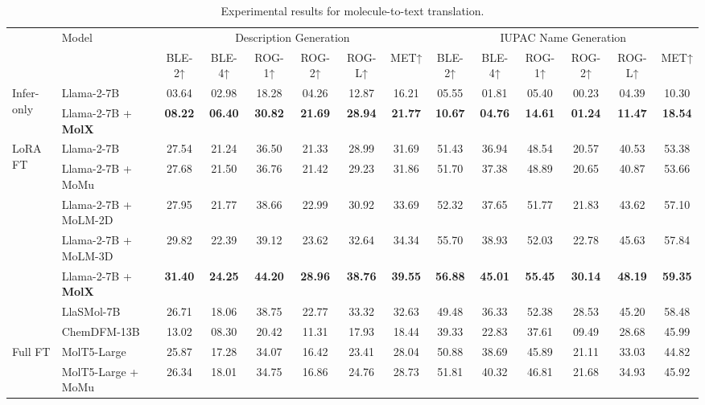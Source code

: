 \begin{table*}[!ht]
\centering
\caption{Experimental results for molecule-to-text translation.}
\label{molecule-to-text-translation}
\setlength{\tabcolsep}{2.99pt}
\renewcommand{\arraystretch}{0.90}
\scriptsize

\begin{tabular*}{\linewidth}{@{\extracolsep{\fill}}ll|cccccc|cccccc}
\toprule

\multirow[t]{2}{*}{} &\multirow[t]{2}{*}{Model} &\multicolumn{6}{c}{Description Generation} &\multicolumn{6}{c}{IUPAC Name Generation} \\
& &BLE-2↑ &BLE-4↑ &ROG-1↑ &ROG-2↑ &ROG-L↑ &MET↑ &BLE-2↑ &BLE-4↑ &ROG-1↑ &ROG-2↑ &ROG-L↑ &MET↑ \\
\midrule
\multirow[t]{2}{*}{Infer-only}
&Llama-2-7B                 &03.64 &02.98 &18.28 &04.26 &12.87 &16.21 &05.55 &01.81 &05.40 &00.23 &04.39 &10.30 \\
&Llama-2-7B + \textbf{MolX} &\textbf{08.22} &\textbf{06.40} &\textbf{30.82} &\textbf{21.69} &\textbf{28.94} &\textbf{21.77} &\textbf{10.67} &\textbf{04.76} &\textbf{14.61} &\textbf{01.24} &\textbf{11.47} &\textbf{18.54} \\
\midrule
\multirow[t]{5}{*}{LoRA FT}
&Llama-2-7B                 &27.54 &21.24 &36.50 &21.33 &28.99 &31.69 &51.43 &36.94 &48.54 &20.57 &40.53 &53.38 \\
&Llama-2-7B + MoMu          &27.68 &21.50 &36.76 &21.42 &29.23 &31.86 &51.70 &37.38 &48.89 &20.65 &40.87 &53.66 \\
&Llama-2-7B + MoLM-2D       &27.95 &21.77 &38.66 &22.99 &30.92 &33.69 &52.32 &37.65 &51.77 &21.83 &43.62 &57.10 \\
&Llama-2-7B + MoLM-3D       &29.82 &22.39 &39.12 &23.62 &32.64 &34.34 &55.70 &38.93 &52.03 &22.78 &45.63 &57.84 \\
&Llama-2-7B + \textbf{MolX} &\textbf{31.40} &\textbf{24.25} &\textbf{44.20} &\textbf{28.96} &\textbf{38.76} &\textbf{39.55} &\textbf{56.88} &\textbf{45.01} &\textbf{55.45} &\textbf{30.14} &\textbf{48.19} &\textbf{59.35} \\
\rowcolor{customgray}
&LlaSMol-7B                 &26.71 &18.06 &38.75 &22.77 &33.32 &32.63 &49.48 &36.33 &52.38 &28.53 &45.20 &58.48 \\
\rowcolor{customgray}
&ChemDFM-13B                &13.02 &08.30 &20.42 &11.31 &17.93 &18.44 &39.33 &22.83 &37.61 &09.49 &28.68 &45.99 \\
\midrule
\multirow[t]{2}{*}{Full FT}
&MolT5-Large        	    &25.87 &17.28 &34.07 &16.42 &23.41 &28.04 &50.88 &38.69 &45.89 &21.11 &33.03 &44.82 \\
&MolT5-Large + MoMu 	    &26.34 &18.01 &34.75 &16.86 &24.76 &28.73 &51.81 &40.32 &46.81 &21.68 &34.93 &45.92 \\

\bottomrule
\end{tabular*}
\end{table*}

